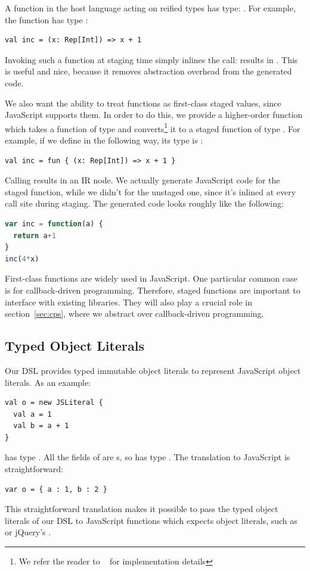 \documentclass[runningheads,a4paper]{llncs}
\begin{document}
A function in the host language acting on reified types has type:
. For example, the function  has type
:
\begin{lstlisting}
val inc = (x: Rep[Int]) => x + 1
\end{lstlisting}

Invoking such a function at staging time simply inlines the call:
 results in . This is useful and nice,
because it removes abstraction overhead from the generated
code.

We also want the ability to treat functions as first-class staged
values, since JavaScript supports them. In order to do this, we
provide a higher-order function  which takes a function of
type  and converts\footnote{We refer the reader
  to ~\cite{lms} for implementation details} it to a staged function
of type . For example, if we define  in
the following way, its type is :
\begin{lstlisting}
val inc = fun { (x: Rep[Int]) => x + 1 }
\end{lstlisting}
Calling  results in an  IR node. We
actually generate JavaScript code for the staged  function,
while we didn't for the unstaged one, since it's inlined at every call
site during staging. The generated code looks roughly like the
following:
\begin{lstlisting}[language=JavaScript]
var inc = function(a) {
  return a+1
}
inc(4*x)
\end{lstlisting}

First-class functions are widely used in JavaScript. One particular
common case is for callback-driven programming. Therefore, staged
functions are important to interface with existing libraries. They
will also play a crucial role in section~\ref{sec:cps}, where we
abstract over callback-driven programming.

\subsection{Typed Object Literals}\label{sec:object-literals}

Our DSL provides typed immutable object literals to represent
JavaScript object literals. As an example:
\begin{lstlisting}
val o = new JSLiteral {
  val a = 1
  val b = a + 1
}
\end{lstlisting}
 has type . All
the fields of  are s, so  has type
. The translation to JavaScript is straightforward:
\begin{lstlisting}
var o = { a : 1, b : 2 }
\end{lstlisting}
This straightforward translation makes it possible to pass the typed
object literals of our DSL to JavaScript functions which expects
object literals, such as  or jQuery's .
\end{document}
